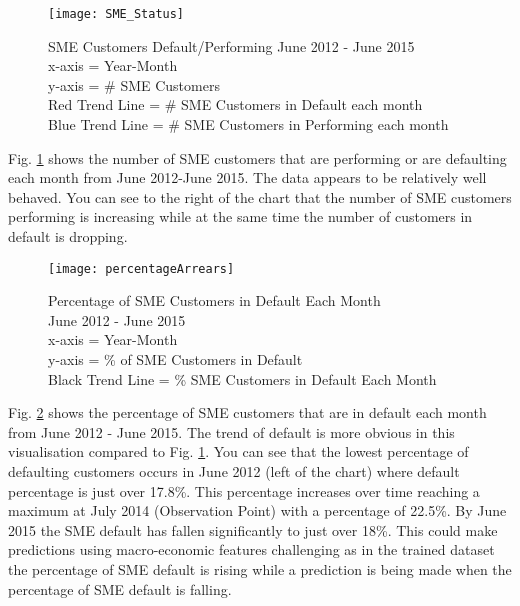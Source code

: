 \begin{figure}[H]
	\texttt{[image: SME\_Status]}
	\caption{SME Customers Default/Performing June 2012 - June 2015 \\ x-axis = Year-Month  \\
		y-axis = \# SME Customers
		\\Red Trend Line = \# SME Customers in Default each month
		\\Blue Trend Line = \# SME Customers in Performing each month}
	\label{fig:SME_Status}
\end{figure}

Fig. \ref{fig:SME_Status} shows the number of SME customers that are performing or are defaulting each month from June 2012-June 2015. The data appears to be relatively well behaved. You can see to the right of the chart that the number of SME customers performing is increasing while at the same time the number of customers in default is dropping. 

\begin{figure}[H]
	\texttt{[image: percentageArrears]}
	\caption{Percentage of SME Customers in Default Each Month 
		\\ June 2012 - June 2015
		\\ x-axis = Year-Month \\
		y-axis = \% of SME Customers in Default
		\\Black Trend Line = \% SME Customers in Default Each Month}
	\label{fig:percentageArrears}
\end{figure}

Fig. \ref{fig:percentageArrears} shows the percentage of SME customers that are in default each month from June 2012 - June 2015. The trend of default is more obvious in this visualisation compared to Fig. \ref{fig:SME_Status}. You can see that the lowest percentage of defaulting customers occurs in June 2012 (left of the chart) where default percentage is just over 17.8\%. This percentage increases over time reaching a maximum at July 2014 (Observation Point) with a percentage of 22.5\%. By June 2015 the SME default has fallen significantly to just over 18\%. This could make predictions using macro-economic features challenging as in the trained dataset the percentage of SME default is rising while a prediction is being made when the percentage of SME default is falling.


